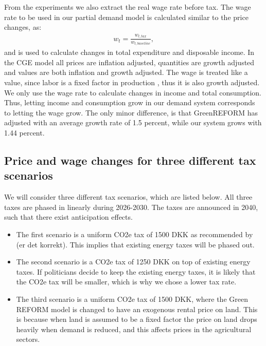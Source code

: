 From the experiments we also extract the real wage rate before tax. The wage rate to be used in our partial demand model is calculated similar to the price changes, as: 
\begin{align}
    w_t =\frac{w_{t,tax}}{w_{t,baseline}},
\end{align}
and is used to calculate changes in total expenditure and disposable income. In the CGE model all prices are inflation adjusted, quantities are growth adjusted and values are both inflation and growth adjusted. The wage is treated like a value, since labor is a fixed factor in production \citep{GR_reform}, thus it is also growth adjusted. We only use the wage rate to calculate changes in income and total consumption. Thus, letting income and consumption grow in our demand system corresponds to letting the wage grow. The only minor difference, is that GreenREFORM has adjusted with an average growth rate of 1.5 percent, while our system grows with 1.44 percent.


\subsection{Price and wage changes for three different tax scenarios}\label{sec:tax_pd}
We will consider three different tax scenarios, which are listed below. All three taxes are phased in linearly during 2026-2030. The taxes are announced in 2040, such that there exist anticipation effects.
\begin{itemize}
    \item The first scenario is a uniform CO2e tax of 1500 DKK as recommended by \cite{klimaraad2021} (er det korrekt). This implies that existing energy taxes will be phased out. 
    \item The second scenario is a CO2e tax of 1250 DKK on top of existing energy taxes. If politicians decide to keep the existing energy taxes, it is likely that the CO2e tax will be smaller, which is why we chose a lower tax rate.
    \item The third scenario is a uniform CO2e tax of 1500 DKK, where the Green REFORM model is changed to have an exogenous rental price on land. This is because when land is assumed to be a fixed factor the price on land drops heavily when demand is reduced, and this affects prices in the agricultural sectors.
\end{itemize}

